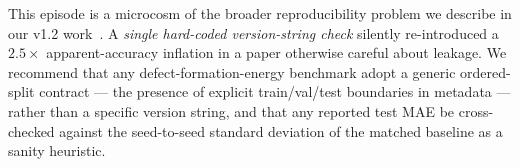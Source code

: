 \documentclass[11pt,a4paper]{article}
\begin{document}
This episode is a microcosm of the broader reproducibility problem
we describe in our v1.2 work~\cite{ourPaperV12}. A
\emph{single hard-coded version-string check} silently re-introduced
a $2.5\times$ apparent-accuracy inflation in a paper otherwise
careful about leakage. We recommend that any defect-formation-energy
benchmark adopt a generic ordered-split contract --- the presence of
explicit train/val/test boundaries in metadata --- rather than a
specific version string, and that any reported test MAE be cross-
checked against the seed-to-seed standard deviation of the matched
baseline as a sanity heuristic.
\end{document}
